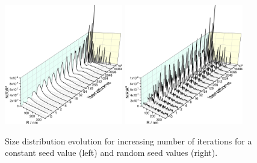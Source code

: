 \begin{figure}[htb]
\centering
\includegraphics[width=0.46\textwidth]{../images/form_factor/EM/EMconstant_seed_smooth_0_0_NR.png}
\hspace{0.06\textwidth}
\includegraphics[width=0.46\textwidth]{../images/form_factor/EM/EMrandom_seed_smooth_0_0_NR.png}
\caption{Size distribution evolution for increasing number of iterations for a constant seed value (left) and random seed values (right).\label{fig:EMNRevolution}}
\end{figure}

